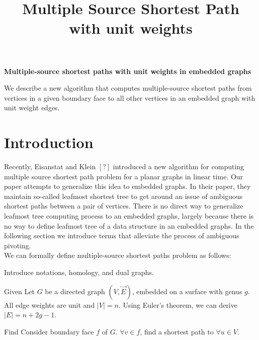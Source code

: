 \documentclass{article}
\begin{document}
\title{Multiple Source Shortest Path with unit weights}

\begin{center}
\textbf{\large Multiple-source shortest paths with unit weights in embedded
graphs}
\end{center}

\DRAFT

\begin{bigabstract}
We describe a new algorithm that computes multiple-source shortest paths from
vertices in a given boundary face to all other vertices in an embedded graph
with unit weight edges.
\end{bigabstract}

\section{Introduction}

Recently, Eisanstat and Klein $[?]$ introduced a new algorithm for computing
multiple source shortest path problem for a planar graphs in linear time. Our 
paper attempts to generalize this idea to embedded graphs. In their paper,
they maintain so-called leafmost shortest tree to get around an issue of 
ambiguous shortest paths between a pair of vertices. There is no direct way 
to generalize leafmost tree computing process to an embedded graphs, largely
because there is no way to define leafmost tree of a data structure in an
embedded graphs. In the following section we introduce terms that alleviate
the process of ambiguous pivoting.\\

We can formally define multiple-source shortest paths problem as follows: \\

\begin{center}
{\color{red}Introduce notations, homology, and dual graphs.}
\end{center}

\begin{oneshot}{Given}
Let $G$ be a directed graph $(V, \vec{E})$, embedded on a surface with genus $g$.
All edge weights are unit and $|V| = n$. Using Euler's theorem, we can derive 
$|E| = n + 2g - 1$.
\end{oneshot}

\begin{oneshot}{Find}
Consider boundary face $f$ of $G$. $\forall v \in f$, find a shortest path to
$\forall u \in V$.
\end{oneshot}
\end{document}
